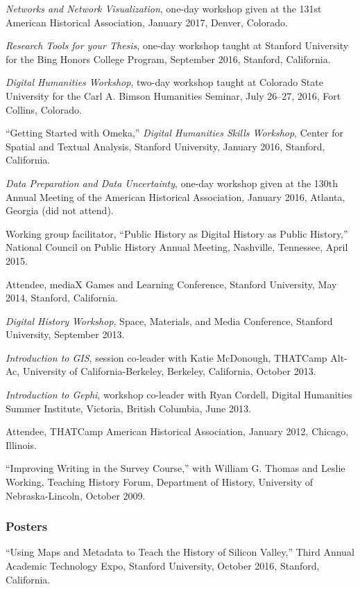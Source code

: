 \emph{Networks and Network Visualization}, one-day workshop given at the
131st American Historical Association, January 2017, Denver, Colorado.

\emph{Research Tools for your Thesis}, one-day workshop taught at
Stanford University for the Bing Honors College Program, September 2016,
Stanford, California.

\emph{Digital Humanities Workshop}, two-day workshop taught at Colorado
State University for the Carl A. Bimson Humanities Seminar, July 26--27,
2016, Fort Collins, Colorado.

``Getting Started with Omeka,'' \emph{Digital Humanities Skills
Workshop}, Center for Spatial and Textual Analysis, Stanford University,
January 2016, Stanford, California.

\emph{Data Preparation and Data Uncertainty}, one-day workshop given at
the 130th Annual Meeting of the American Historical Association, January
2016, Atlanta, Georgia (did not attend).

Working group facilitator, ``Public History as Digital History as Public
History,'' National Council on Public History Annual Meeting, Nashville,
Tennessee, April 2015.

Attendee, mediaX Games and Learning Conference, Stanford University, May
2014, Stanford, California.

\emph{Digital History Workshop}, Space, Materials, and Media Conference,
Stanford University, September 2013.

\emph{Introduction to GIS}, session co-leader with Katie McDonough,
THATCamp Alt-Ac, University of California-Berkeley, Berkeley,
California, October 2013.

\emph{Introduction to Gephi}, workshop co-leader with Ryan Cordell,
Digital Humanities Summer Institute, Victoria, British Columbia, June
2013.

Attendee, THATCamp American Historical Association, January 2012,
Chicago, Illinois.

``Improving Writing in the Survey Course,'' with William G. Thomas and
Leslie Working, Teaching History Forum, Department of History,
University of Nebraska-Lincoln, October 2009.

\subsubsection{Posters}\label{posters}

``Using Maps and Metadata to Teach the History of Silicon Valley,''
Third Annual Academic Technology Expo, Stanford University, October
2016, Stanford, California.

